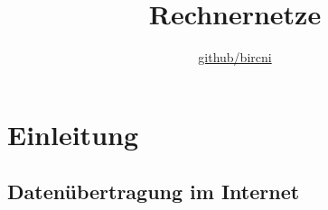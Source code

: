 \documentclass{scrreprt}
\title{Rechnernetze}
\author{\href{https://github.com/bircni}{\color{black}github/bircni}}
\date{}
\begin{document}
\maketitle
\pagebreak
\renewcommand{\contentsname}{Inhaltsverzeichnis}
\newcommand\tab[1][1cm]{\hspace*{#1}}
\setcounter{tocdepth}{1}
\tableofcontents
{}
\pagebreak
{}
\chapter{Einleitung}
\section{Datenübertragung im Internet}
\end{document}
